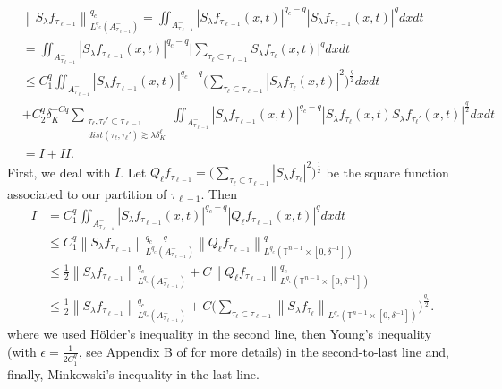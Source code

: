 \documentclass[11pt]{amsart}
\numberwithin{equation}{section}
\newcommand{\Tn}{\mathbb{T}^{n-1}}
\newcommand{\la}{\lambda}
\newcommand\norm[1]{\left\lVert#1\right\rVert}
\newcommand{\lpnorm}[3]{\norm{#1}_{L^{#2}(#3)}}
\newcommand{\Sl}{S_{\la}}
\newcommand{\dK}[1]{\delta_{K}^{#1}}
\newcommand{\Sq}[3]{Q_{#3}^{#2}#1}
\begin{document}
\begin{equation} \label{estimate in terms of broad and narrow terms}
\begin{split}
    &\lpnorm{\Sl f_{\tau_{\ell - 1}}}{q_c}{A_{\tau_{\ell - 1}}^{-}}^{q_c} = \iint_{A_{\tau_{\ell - 1}}^{-}}|\Sl f_{\tau_{\ell - 1}}(x,t)|^{q_c - q}|\Sl f_{\tau_{\ell - 1}}(x,t)|^{q}dxdt \\
    &=  \iint_{A_{\tau_{\ell - 1}}^{-}}|\Sl f_{\tau_{\ell - 1}}(x,t)|^{q_c - q}\Big|\sum_{\tau_{\ell} \subset \tau_{\ell - 1}}\Sl f_{\tau_{\ell}}(x,t)\Big|^{q}dxdt \\ 
    &\leq C_1^{q}\iint_{A_{\tau_{\ell - 1}}^{-}}|\Sl f_{\tau_{\ell - 1}}(x,t)|^{q_c - q}\Big(\sum_{\tau_{\ell} \subset \tau_{\ell - 1}}|\Sl f_{\tau_{\ell}}(x,t)|^{2}\Big)^{\frac{q}{2}}dxdt \\
    &+ C_2^{q}\dK{-Cq} \sum_{\substack{\tau_{\ell},\tau_{\ell}' \subset \tau_{\ell - 1} \\ dist(\tau_{\ell}, \tau_{\ell}') \gtrsim \la \dK{\ell}}} \iint_{A_{\tau_{\ell - 1}}^{-}}|\Sl f_{\tau_{\ell - 1}}(x,t)|^{q_c - q}  |\Sl f_{\tau_{\ell}}(x,t)\Sl f_{\tau_{\ell}'}(x,t)|^{\frac{q}{2}}dxdt \\ 
    & = I + II.
\end{split}
\end{equation}
First, we deal with $I$. Let $\Sq{f_{\tau_{\ell - 1}}}{}{\ell} = \Big( \sum_{\tau_{\ell} \subset \tau_{\ell - 1}} |\Sl f_{\tau_{\ell}}|^2\Big)^{\frac{1}{2}}$ be the square function associated to our partition of $\tau_{\ell - 1}$. Then 
\begin{equation} \label{narrow term estimate}
\begin{split}
    I &= C_1^{q} \iint_{A_{\tau_{\ell - 1}}^{-}}|\Sl f_{\tau_{\ell - 1}}(x,t)|^{q_c - q} |\Sq{f_{\tau_{\ell - 1}}}{}{\ell}(x,t)|^qdxdt \\
    &\leq C_1^{q}\lpnorm{\Sl f_{\tau_{\ell - 1}}}{q_c}{A_{\tau_{\ell - 1}}^{-}}^{q_c-q} \lpnorm{\Sq{f_{\tau_{\ell - 1}}}{}{\ell}}{q_c}{\Tn \times [0, \delta^{-1}]}^{q} \\
    &\leq \frac{1}{2}\lpnorm{\Sl f_{\tau_{\ell - 1}}}{q_c}{A_{\tau_{\ell - 1}}^{-}}^{q_c} + C\lpnorm{\Sq{f_{\tau_{\ell - 1}}}{}{\ell}}{q_c}{\Tn \times [0, \delta^{-1}]}^{q_c} \\
    &\leq \frac{1}{2}\lpnorm{\Sl f_{\tau_{\ell - 1}}}{q_c}{A_{\tau_{\ell - 1}}^{-}}^{q_c} + C\Big(\sum_{\tau_{\ell} \subset \tau_{\ell - 1}} \lpnorm{\Sl f_{\tau_{\ell}}}{q_c}{\Tn \times [0, \delta^{-1}]}\Big)^{\frac{q_c}{2}}.
\end{split} 
\end{equation}
where we used H\"{o}lder's inequality in the second line, then Young's inequality (with $\epsilon = \frac{1}{2 C_{1}^{q}}$, see Appendix B of \cite{EvansPDE} for more details) in the second-to-last line and, finally, Minkowski's inequality in the last line.
\end{document}
